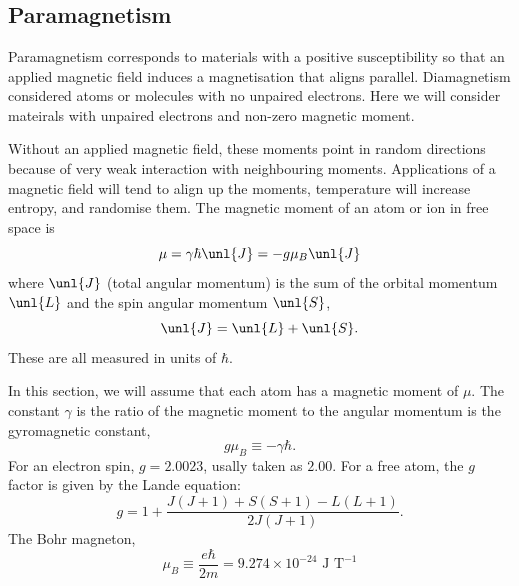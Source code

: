 \documentclass[a4paper, 11pt, normalem]{report}
\begin{document}
\chapter{}
\section{Paramagnetism}
Paramagnetism corresponds to materials with a positive susceptibility so that an applied magnetic field induces a magnetisation that aligns parallel. 
Diamagnetism considered atoms or molecules with no unpaired electrons. 
Here we will consider mateirals with unpaired electrons and non-zero magnetic moment. 

Without an applied magnetic field, these moments point in random directions because of very weak interaction with neighbouring moments.
Applications of a magnetic field will tend to align up the moments, temperature will increase entropy, and randomise them. 
The magnetic moment of an atom or ion in free space is 
\begin{equation}
    \mu = \gamma\hbar\unl{J} = -g\mu_B\unl{J}
\end{equation}
where $\unl{J}$ (total angular momentum) is the sum of the orbital momentum $\unl{L}$ and the spin angular momentum $\unl{S}$,
\begin{equation}
    \unl{J} = \unl{L} + \unl{S}.
\end{equation}
These are all measured in units of $\hbar$.

In this section, we will assume that each atom has a magnetic moment of $\mu$.
The constant $\gamma$ is the ratio of the magnetic moment to the angular momentum is the gyromagnetic constant,
\begin{equation}
    g\mu_B \equiv -\gamma\hbar.
\end{equation}
For an electron spin, $g=2.0023$, usally taken as $2.00$.
For a free atom, the $g$ factor is given by the Lande equation:
\begin{equation}
    g = 1 + \frac{J(J+1) + S(S+1) - L(L+1)}{2J(J+1)}.
\end{equation}
The Bohr magneton, 
\begin{equation}
    \mu_B \equiv \frac{e\hbar}{2m} = 9.274\times10^{-24}\text{ J T}^{-1}
\end{equation}
\end{document}
